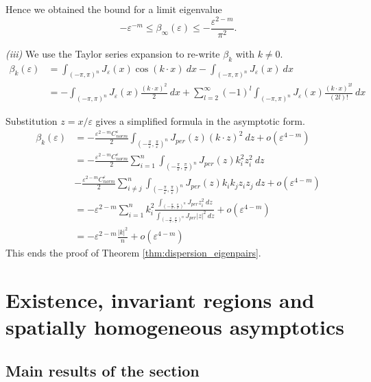\documentclass[12pt, a4paper]{article}
\theoremstyle{break}
\theoremstyle{break}
\theoremstyle{break}
\theoremstyle{break}
\theoremstyle{break}
\begin{document}
Hence we obtained the bound for a limit eigenvalue
\begin{equation*}
    -\varepsilon^{-m} \leq \beta_\infty(\varepsilon) \leq -\frac{\varepsilon^{2-m}}{\pi^2}.
\end{equation*}

\textit{(iii)} We use the Taylor series expansion to re-write $\beta_k$ with $k \neq 0$.
\begin{align*}
    \beta_k(\varepsilon)
    &= \int_{(-\pi, \pi)^n} J_\varepsilon(x)\cos(k\cdot x)\:dx - \int_{(-\pi, \pi)^n} J_\varepsilon(x)\:dx \\
    &= - \int_{(-\pi, \pi)^n} J_\varepsilon(x) \frac{(k\cdot x)^2}{2}\: dx + \sum_{l=2}^\infty (-1)^l \int_{(-\pi, \pi)^n} J_\varepsilon(x)\frac{(k\cdot x)^{2l}}{(2l)!}\:dx
\end{align*}

Substitution $z = x / \varepsilon$ gives a simplified formula in the asymptotic form.
\begin{align*}
    \beta_k(\varepsilon)   &= -\frac{\varepsilon^{2-m} C_{norm}^\varepsilon}{2} \int_{\left(-\frac{\pi}{\varepsilon}, \frac{\pi}{\varepsilon}\right)^n} J_{per}(z) (k \cdot z)^2 \:dz + o(\varepsilon^{4-m}) \\
    &= -\frac{\varepsilon^{2-m} C_{norm}^\varepsilon}{2} \sum_{i=1}^n \int_{\left(-\frac{\pi}{\varepsilon}, \frac{\pi}{\varepsilon}\right)^n} J_{per}(z) k_i^2z_i^2 \:dz\\
    &-\frac{\varepsilon^{2-m} C_{norm}^\varepsilon}{2} \sum_{i\neq j}^n \int_{\left(-\frac{\pi}{\varepsilon}, \frac{\pi}{\varepsilon}\right)^n} J_{per}(z) k_ik_jz_iz_j \:dz + o(\varepsilon^{4-m})\\
    &= - \varepsilon^{2-m} \sum_{i=1}^n k_{i}^2 \frac{\int_{\left(-\frac{\pi}{\varepsilon}, \frac{\pi}{\varepsilon}\right)^n} J_{per} z_i^2\:dz}{\int_{\left(-\frac{\pi}{\varepsilon}, \frac{\pi}{\varepsilon}\right)^n} J_{per} |z|^2\:dz} + o(\varepsilon^{4-m}) \\
    &=  - \varepsilon^{2-m}\frac{|k|^2}{n}  + o(\varepsilon^{4-m})
\end{align*}
This ends the proof of Theorem \ref{thm:dispersion_eigenpairs}.

\section{Existence, invariant regions and spatially homogeneous asymptotics} \label{sec:existence_invariant_regions_homo_asymptotics}

\subsection{Main results of the section}
\end{document}
